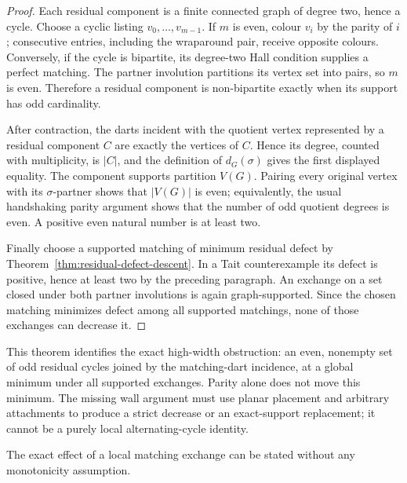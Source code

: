 \begin{proof}
Each residual component is a finite connected graph of degree two, hence a
cycle.  Choose a cyclic listing \(v_0,\ldots,v_{m-1}\).  If \(m\) is even,
colour \(v_i\) by the parity of \(i\); consecutive entries, including the
wraparound pair, receive opposite colours.  Conversely, if the cycle is
bipartite, its degree-two Hall condition supplies a perfect matching.  The
partner involution partitions its vertex set into pairs, so \(m\) is even.
Therefore a residual component is non-bipartite exactly when its support has
odd cardinality.

After contraction, the darts incident with the quotient vertex represented by
a residual component \(C\) are exactly the vertices of \(C\).  Hence its
degree, counted with multiplicity, is \(|C|\), and the definition of
\(d_G(\sigma)\) gives the first displayed equality.  The component supports
partition \(V(G)\).  Pairing every original vertex with its
\(\sigma\)-partner shows that \(|V(G)|\) is even; equivalently, the usual
handshaking parity argument shows that the number of odd quotient degrees is
even.  A positive even natural number is at least two.

Finally choose a supported matching of minimum residual defect by
Theorem~\ref{thm:residual-defect-descent}.  In a Tait counterexample its defect
is positive, hence at least two by the preceding paragraph.  An exchange on a
set closed under both partner involutions is again graph-supported.  Since the
chosen matching minimizes defect among all supported matchings, none of those
exchanges can decrease it.
\end{proof}

This theorem identifies the exact high-width obstruction: an even, nonempty
set of odd residual cycles joined by the matching-dart incidence, at a global
minimum under all supported exchanges.  Parity alone does not move this
minimum.  The missing wall argument must use planar placement and arbitrary
attachments to produce a strict decrease or an exact-support replacement; it
cannot be a purely local alternating-cycle identity.

The exact effect of a local matching exchange can be stated without any
monotonicity assumption.

